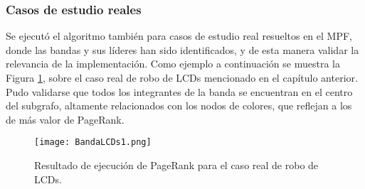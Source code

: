\subsubsection{Casos de estudio reales}

Se ejecutó el algoritmo también para casos de estudio real resueltos en el MPF, donde las bandas y sus líderes han sido identificados, y de esta manera validar la relevancia de la implementación. Como ejemplo a continuación se muestra la Figura \ref{fig:BandaLCDs1}, sobre el caso real de robo de LCDs mencionado en el capítulo anterior. Pudo validarse que todos los integrantes de la banda se encuentran en el centro del subgrafo, altamente relacionados con los nodos de colores, que reflejan a los de más valor de PageRank.


\begin{figure}
	\centering
	\texttt{[image: BandaLCDs1.png]}
	\caption{Resultado de ejecución de PageRank para el caso real de robo de LCDs.} 
	\label{fig:BandaLCDs1}
\end{figure}
